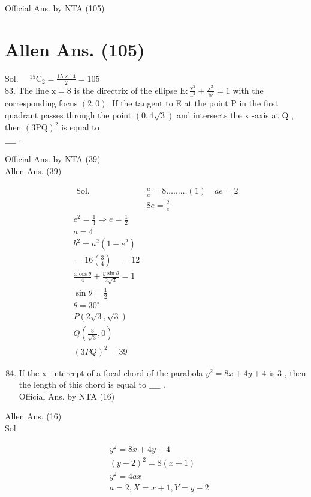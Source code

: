 \documentclass[10pt]{article}
\begin{document}
Official Ans. by NTA (105)

\section*{Allen Ans. (105)}
Sol. \(\quad{ }^{15} \mathrm{C}_{2}=\frac{15 \times 14}{2}=105\)\\
83. The line \(\mathrm{x}=8\) is the directrix of the ellipse \(\mathrm{E}: \frac{\mathrm{x}^{2}}{\mathrm{a}^{2}}+\frac{\mathrm{y}^{2}}{\mathrm{~b}^{2}}=1\) with the corresponding focus \((2,0)\). If the tangent to E at the point P in the first quadrant passes through the point \((0,4 \sqrt{3})\) and intersects the x -axis at Q , then \((3 \mathrm{PQ})^{2}\) is equal to\\
\(\_\_\_\_\) .

Official Ans. by NTA (39)\\
Allen Ans. (39)

\[
\begin{array}{ll}
\text { Sol. } & \frac{a}{e}=8 \ldots \ldots \ldots(1) \quad a e=2 \\
& 8 e=\frac{2}{e} \\
e^{2}=\frac{1}{4} \Rightarrow e=\frac{1}{2} \\
a=4 \\
b^{2}=a^{2}\left(1-e^{2}\right) \\
=16\left(\frac{3}{4}\right) \quad=12 \\
\frac{x \cos \theta}{4}+\frac{y \sin \theta}{2 \sqrt{3}}=1 \\
\sin \theta=\frac{1}{2} \\
\theta=30^{\circ} \\
P(2 \sqrt{3}, \sqrt{3}) \\
Q\left(\frac{8}{\sqrt{3}}, 0\right) \\
(3 P Q)^{2}=39
\end{array}
\]

\begin{enumerate}
  \setcounter{enumi}{83}
  \item If the x -intercept of a focal chord of the parabola \(y^{2}=8 x+4 y+4\) is 3 , then the length of this chord is equal to \(\_\_\_\_\) .\\
Official Ans. by NTA (16)
\end{enumerate}

Allen Ans. (16)\\
Sol.

\[
\begin{aligned}
& y^{2}=8 x+4 y+4 \\
& (y-2)^{2}=8(x+1) \\
& y^{2}=4 a x \\
& a=2, X=x+1, Y=y-2
\end{aligned}
\]
\end{document}
